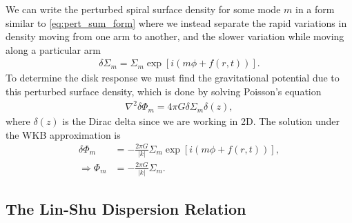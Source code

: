 We can write the perturbed spiral surface density for some mode $m$ in a form similar to \ref{eq:pert_sum_form} where we instead separate the rapid variations in density moving from one arm to another, and the slower variation while moving along a particular arm
\begin{align}
    \delta \Sigma_m = \Sigma_m \exp \left[ i \left( m \phi + f(r,t)  \right)  \right]. \label{eq:sigma_WKB}
\end{align}
To determine the disk response we must find the gravitational potential due to this perturbed surface density, which is done by solving Poisson's equation
\begin{align}
    \nabla^2 \delta \Phi_m = 4 \pi G \delta \Sigma_m \delta(z), \label{eq:poisson_pert}
\end{align}
where $\delta(z)$ is the Dirac delta since we are working in 2D. 
The solution under the WKB approximation is \citep[eg.][]{binney2008}
\begin{align}
    \delta \Phi_m &= - \frac{2 \pi G}{|k|} \Sigma_m \exp \left[ i \left( m \phi + f(r,t)  \right)  \right], \\
    \Rightarrow \Phi_m &= - \frac{2 \pi G}{|k|} \Sigma_m. \label{eq:phi_m_sigma_m}
\end{align}

\subsection{The Lin-Shu Dispersion Relation} \label{sec:linshu}

